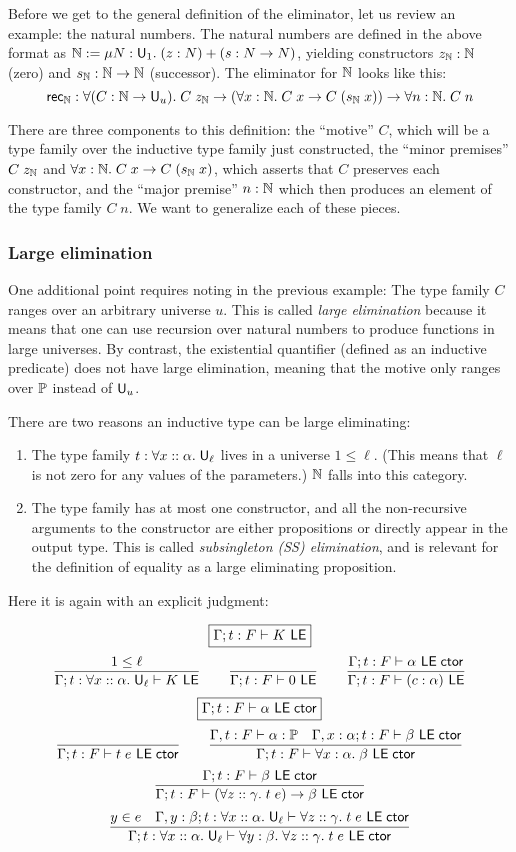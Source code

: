 Before we get to the general definition of the eliminator, let us review an example: the natural numbers. The natural numbers are defined in the above format as $\N:=\mu N:\U_1.\;(z:N)+(s:N\to N)$, yielding constructors $z_\N:\N$ (zero) and $s_\N:\N\to\N$ (successor). The eliminator for $\N$ looks like this:
$$\mathsf{rec}_\N:\forall (C:\N\to \U_u).\;C\;z_\N\to(\forall x:\N.\;C\;x\to C\;(s_\N\;x))\to\forall n:\N.\;C\;n$$

There are three components to this definition: the ``motive'' $C$, which will be a type family over the inductive type family just constructed, the ``minor premises'' $C\;z_\N$ and $\forall x:\N.\;C\;x\to C\;(s_\N\;x)$, which asserts that $C$ preserves each constructor, and the ``major premise'' $n:\N$ which then produces an element of the type family $C\;n$. We want to generalize each of these pieces.

\subsubsection{Large elimination}\label{sec:large_elim}
One additional point requires noting in the previous example: The type family $C$ ranges over an arbitrary universe $u$. This is called \emph{large elimination} because it means that one can use recursion over natural numbers to produce functions in large universes. By contrast, the existential quantifier (defined as an inductive predicate) does not have large elimination, meaning that the motive only ranges over $\P$ instead of $\U_u$.

There are two reasons an inductive type can be large eliminating:
\begin{enumerate}
\item The type family $t:\forall x::\alpha.\;\U_\ell$ lives in a universe $1\le\ell$. (This means that $\ell$ is not zero for any values of the parameters.) $\N$ falls into this category.
\item The type family has at most one constructor, and all the non-recursive arguments to the constructor are either propositions or directly appear in the output type. This is called \emph{subsingleton (SS) elimination}, and is relevant for the definition of equality as a large eliminating proposition.
\end{enumerate}
Here it is again with an explicit judgment:

$$\boxed{\Gamma;t:F\vdash K\LE}$$
$$\frac{1\le\ell}{\Gamma;t:\forall x::\alpha.\;\U_\ell\vdash K\LE}\qquad
\frac{}{\Gamma;t:F\vdash 0\LE}\qquad
\frac{\Gamma;t:F\vdash \alpha\LEctor}{\Gamma;t:F\vdash (c:\alpha)\LE}$$
$$\boxed{\Gamma;t:F\vdash \alpha\LEctor}$$
$$\frac{}{\Gamma;t:F\vdash t\;e\LEctor}\qquad
\frac{\Gamma,t:F\vdash \alpha:\P\quad \Gamma,x:\alpha;t:F\vdash\beta\LEctor}{\Gamma;t:F\vdash\forall x:\alpha.\;\beta\LEctor}$$
$$\frac{\Gamma;t:F\vdash\beta\LEctor}{\Gamma;t:F\vdash(\forall z::\gamma.\;t\;e)\to\beta\LEctor}$$
$$\frac{y\in e\quad \Gamma,y:\beta;t:\forall x::\alpha.\;\U_\ell\vdash\forall z::\gamma.\; t\;e\LEctor}{\Gamma;t:\forall x::\alpha.\;\U_\ell\vdash\forall y:\beta.\;\forall z::\gamma.\;t\;e\LEctor}$$

